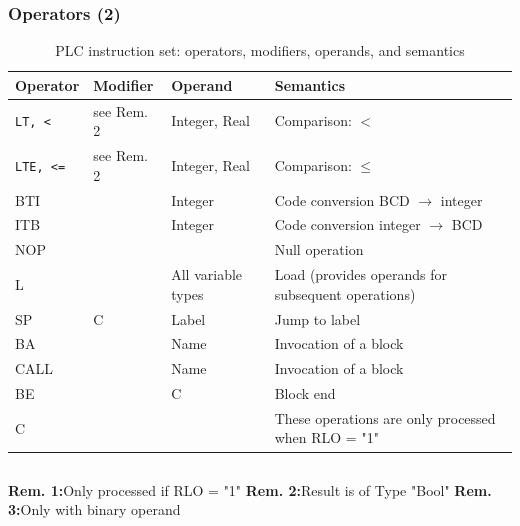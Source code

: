 \begin{frame}
	\frametitle{Operators (2)}
	\footnotesize
	\begin{center}
		\begin{table}
			\setlength{\tabcolsep}{3pt}
			\centering
			\begin{tabular}{@{}>{\raggedright\arraybackslash}p{2.5cm}
							>{\raggedright\arraybackslash}p{2cm}
							>{\raggedright\arraybackslash}p{2.5cm}
							>{\raggedright\arraybackslash}p{5cm}@{}}
				\toprule
				\textbf{Operator} & \textbf{Modifier} & \textbf{Operand} & \textbf{Semantics} \\
				\midrule
				\texttt{LT, <} & see Rem. 2 & Integer, Real & Comparison: $<$ \\
				\texttt{LTE, <=} & see Rem. 2 & Integer, Real & Comparison: $\leq$ \\
				BTI      &            & Integer & Code conversion BCD $\rightarrow$ integer \\
				ITB      &            & Integer & Code conversion integer $\rightarrow$ BCD \\
				NOP      &            &                    & Null operation \\
				L        &            & All variable types & Load (provides operands for subsequent operations) \\
				SP       & C          & Label              & Jump to label \\
				BA       &            & Name               & Invocation of a block \\
				CALL     &            & Name               & Invocation of a block \\
				BE       &            & C                  & Block end \\
				C        &            &                    & These operations are only processed when RLO = "1" \\
				\bottomrule
			\end{tabular}
			\caption{PLC instruction set: operators, modifiers, operands, and semantics}
			\label{tab:plc_operators}
		\end{table}
	\end{center}
	\begin{columns}
			\textbf{Rem. 1:}Only processed if RLO = "1"
			\textbf{Rem. 2:}Result is of Type "Bool"
			\textbf{Rem. 3:}Only with binary operand
	\end{columns}
\end{frame}
